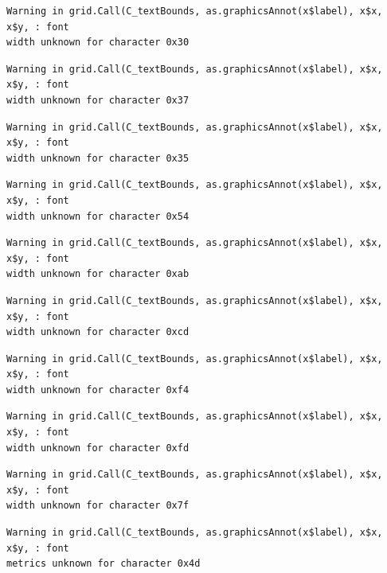 \documentclass[
  letterpaper,
  DIV=11,
  numbers=noendperiod]{scrreprt}
\begin{document}
\begin{verbatim}
Warning in grid.Call(C_textBounds, as.graphicsAnnot(x$label), x$x, x$y, : font
width unknown for character 0x30
\end{verbatim}

\begin{verbatim}
Warning in grid.Call(C_textBounds, as.graphicsAnnot(x$label), x$x, x$y, : font
width unknown for character 0x37
\end{verbatim}

\begin{verbatim}
Warning in grid.Call(C_textBounds, as.graphicsAnnot(x$label), x$x, x$y, : font
width unknown for character 0x35
\end{verbatim}

\begin{verbatim}
Warning in grid.Call(C_textBounds, as.graphicsAnnot(x$label), x$x, x$y, : font
width unknown for character 0x54
\end{verbatim}

\begin{verbatim}
Warning in grid.Call(C_textBounds, as.graphicsAnnot(x$label), x$x, x$y, : font
width unknown for character 0xab
\end{verbatim}

\begin{verbatim}
Warning in grid.Call(C_textBounds, as.graphicsAnnot(x$label), x$x, x$y, : font
width unknown for character 0xcd
\end{verbatim}

\begin{verbatim}
Warning in grid.Call(C_textBounds, as.graphicsAnnot(x$label), x$x, x$y, : font
width unknown for character 0xf4
\end{verbatim}

\begin{verbatim}
Warning in grid.Call(C_textBounds, as.graphicsAnnot(x$label), x$x, x$y, : font
width unknown for character 0xfd
\end{verbatim}

\begin{verbatim}
Warning in grid.Call(C_textBounds, as.graphicsAnnot(x$label), x$x, x$y, : font
width unknown for character 0x7f
\end{verbatim}

\begin{verbatim}
Warning in grid.Call(C_textBounds, as.graphicsAnnot(x$label), x$x, x$y, : font
metrics unknown for character 0x4d
\end{verbatim}
\end{document}
